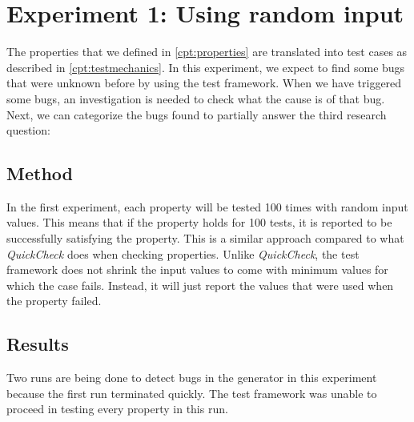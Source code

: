 \chapter{Experiment 1: Using random input}
\label{cpt:experiment1}
The properties that we defined in \autoref{cpt:properties} are translated into
test cases as described in \autoref{cpt:testmechanics}. In this experiment, we
expect to find some bugs that were unknown before by using the test framework.
When we have triggered some bugs, an investigation is needed to check what the
cause is of that bug. Next, we can categorize the bugs found to partially answer
the third research question:\rqThree

\section{Method}
In the first experiment, each property will be tested 100 times with random
input values. This means that if the property holds for 100 tests, it is
reported to be successfully satisfying the property. This is a similar approach
compared to what \textit{QuickCheck} does when checking properties. Unlike
\textit{QuickCheck}, the test framework does not shrink the input values to come
with minimum values for which the case fails. Instead, it will just report the
values that were used when the property failed.

\section{Results}
Two runs are being done to detect bugs in the generator in this experiment
because the first run terminated quickly. The test framework was unable to
proceed in testing every property in this run.

